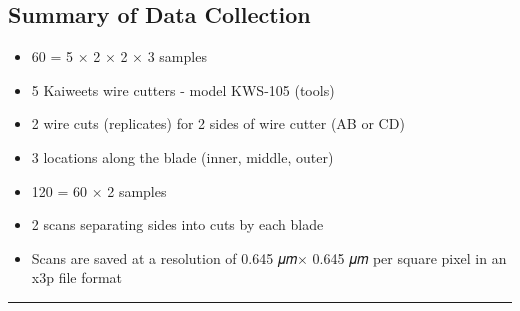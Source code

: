 \documentclass[fleqn,10pt]{wlscirep}
\begin{document}
\subsection*{Summary of Data Collection}

\begin{itemize}
  \item
  60 = 5 × 2 × 2 × 3 samples
  
  \item
  5 Kaiweets wire cutters - model KWS-105 (tools)

  \item
  2 wire cuts (replicates) for 2 sides of wire cutter (AB or CD)

  \item
  3 locations along the blade (inner, middle, outer)
  
  \item
  120 = 60 × 2 samples
  
  \item
  2 scans separating sides into cuts by each blade

  \item
  Scans are saved at a resolution of 0.645 𝜇𝑚× 0.645 𝜇𝑚 per square pixel in an x3p file format
\end{itemize}

\begin{center}\rule{0.5\linewidth}{0.5pt}\end{center}
\end{document}
